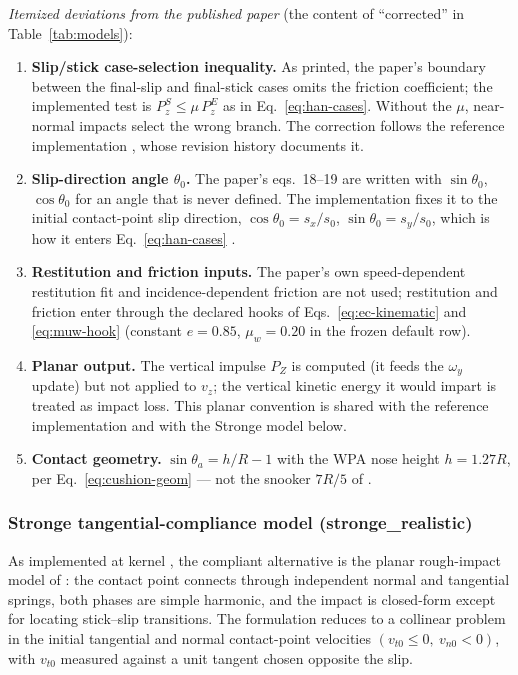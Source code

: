 \emph{Itemized deviations from the published paper} (the content of
``corrected'' in Table~\ref{tab:models}):
\begin{enumerate}
\item \textbf{Slip/stick case-selection inequality.} As printed, the
  paper's boundary between the final-slip and final-stick cases omits
  the friction coefficient; the implemented test is
  $P_z^{S} \le \mu\,P_z^{E}$ as in Eq.~\eqref{eq:han-cases}. Without
  the $\mu$, near-normal impacts select the wrong branch. The
  correction follows the reference implementation
  \citep{kiefl2024pooltool}, whose revision history documents it.
\item \textbf{Slip-direction angle $\theta_0$.} The paper's eqs.~18--19
  are written with $\sin\theta_0$, $\cos\theta_0$ for an angle that is
  never defined. The implementation fixes it to the initial
  contact-point slip direction, $\cos\theta_0 = s_x/s_0$,
  $\sin\theta_0 = s_y/s_0$, which is how it enters
  Eq.~\eqref{eq:han-cases} \citep[same lineage;][]{kiefl2024pooltool}.
\item \textbf{Restitution and friction inputs.} The paper's own
  speed-dependent restitution fit and incidence-dependent friction are
  not used; restitution and friction enter through the declared hooks
  of Eqs.~\eqref{eq:ec-kinematic} and \eqref{eq:muw-hook} (constant
  $e = 0.85$, $\mu_w = 0.20$ in the frozen default row).
\item \textbf{Planar output.} The vertical impulse $P_Z$ is computed
  (it feeds the $\omega_y$ update) but not applied to $v_z$; the
  vertical kinetic energy it would impart is treated as impact loss.
  This planar convention is shared with the reference implementation
  and with the Stronge model below.
\item \textbf{Contact geometry.} $\sin\theta_a = h/R - 1$ with the WPA
  nose height $h = 1.27R$, per Eq.~\eqref{eq:cushion-geom} --- not the
  snooker $7R/5$ of \citet{mathavan2010cushion}.
\end{enumerate}

\subsubsection{Stronge tangential-compliance model (stronge\_realistic)}
\label{sec:appendix-eq-stronge}

As implemented at kernel , the compliant
alternative is the planar rough-impact model of
\citet[ch.~5]{stronge2018impact}: the contact point connects through
independent normal and tangential springs, both phases are simple
harmonic, and the impact is closed-form except for locating stick--slip
transitions. The formulation reduces to a collinear problem in the
initial tangential and normal contact-point velocities
$(v_{t0} \le 0,\ v_{n0} < 0)$, with $v_{t0}$ measured against a unit
tangent chosen opposite the slip.

